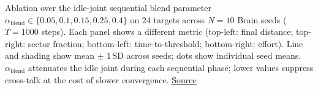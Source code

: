 Ablation over the idle-joint sequential blend parameter $\alpha_\mathrm{blend} \in \{0.05, 0.1, 0.15, 0.25, 0.4\}$ on 24 targets across $N=10$ Brain seeds ($T=1000$ steps). Each panel shows a different metric (top-left: final distance; top-right: sector fraction; bottom-left: time-to-threshold; bottom-right: effort). Line and shading show mean $\pm$ 1\,SD across seeds; dots show individual seed means. $\alpha_\mathrm{blend}$ attenuates the idle joint during each sequential phase; lower values suppress cross-talk at the cost of slower convergence. \href{https://github.com/tahmidazam/gg4/blob/main/notebooks/cartesian_control_ablation_blend/cartesian_control_ablation_blend.ipynb}{\underline{Source}}%